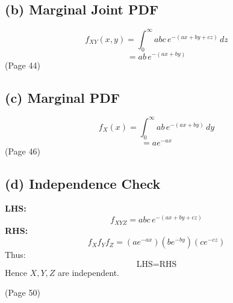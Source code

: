 \documentclass{article}
\begin{document}
\subsection*{(b) Marginal Joint PDF}

\[f_{XY}(x,y)=\int_{0}^{\infty} abc\,e^{-(ax+by+cz)}\,dz\]
\[=ab\,e^{-(ax+by)}\]
(Page 44)

\subsection*{(c) Marginal PDF}

\[f_X(x)=\int_{0}^{\infty} ab\,e^{-(ax+by)}\,dy\]
\[= a e^{-ax}\]
(Page 46)

\subsection*{(d) Independence Check}

\textbf{LHS:}
\[f_{XYZ}=abc\,e^{-(ax+by+cz)}\]
\textbf{RHS:}
\[f_X f_Y f_Z=(a e^{-ax})(b e^{-by})(c e^{-cz})\]
Thus:
\[\text{LHS}=\text{RHS}\]
Hence $X,Y,Z$ are independent.

(Page 50)
\end{document}
